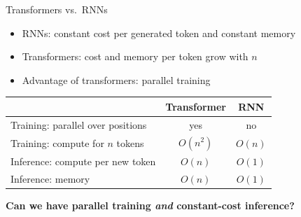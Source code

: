 \documentclass[11pt,compress,t,notes=noshow, xcolor=table]{beamer}
\newcommand{\good}[1]{\textcolor{teal!60!black}{#1}}
\newcommand{\bad}[1]{\textcolor{red!70!black}{#1}}
\begin{document}
\begin{frame}{Transformers vs.\ RNNs}

\vfill

\begin{itemize}
  \item RNNs: constant cost per generated token and constant memory
  \item Transformers: cost and memory per token grow with $n$
  \item Advantage of transformers: parallel training
\end{itemize}

\medskip
\medskip


\begin{center}
\small
\begin{tabular}{@{}lcc@{}}
  \toprule
                                      & Transformer               & RNN \\
  \midrule
  Training: parallel over positions   & \good{yes}                & \bad{no} \\
  Training: compute for $n$ tokens    & \bad{$O(n^2)$}            & \good{$O(n)$} \\
  Inference: compute per new token    & \bad{$O(n)$}              & \good{$O(1)$} \\
  Inference: memory                   & \bad{$O(n)$}  & \good{$O(1)$} \\
  \bottomrule
\end{tabular}
\end{center}

\medskip
\medskip

\pause

\begin{center}
\textbf{Can we have parallel training \emph{and} constant-cost inference?}
\end{center}

\vfill

\end{frame}

\end{document}
